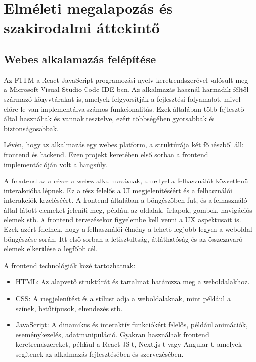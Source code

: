 \chapter{Elméleti megalapozás és szakirodalmi áttekintő}

\section {Webes alkalamazás felépítése}

Az F1TM a React JavaScript programozási nyelv keretrendszerével valósult meg a Microsoft Visual Studio Code IDE-ben. Az alkalmazás használ harmadik féltől származó könyvtárakat is, amelyek felgyorsítják a fejlesztési folyamatot, mivel előre le van implementálva számos funkcionalitás. Ezek általában több fejlesztő által használtak és vannak tesztelve, ezért többségében gyorsabbak és biztonságosabbak.

Lévén, hogy az alkalmazás egy webes platform, a struktúrája két fő részből áll: frontend és backend. Ezen projekt keretében első sorban a frontend implementációján volt a hangsúly.

A frontend az a része a webes alkalmazásnak, amellyel a felhasználók közvetlenül interakcióba lépnek. Ez a rész felelős a UI megjelenítéséért és a felhasználói interakciók kezeléséért. A frontend általában a böngészőben fut, és a felhasználó által látott elemeket jeleníti meg, például az oldalak, űrlapok, gombok, navigációs elemek stb. A frontend tervezésekor figyelembe kell venni a UX aspektusait is. Ezek azért felelnek, hogy a felhasználói élmény a lehető legjobb legyen a weboldal böngészése során. Itt első sorban a letisztultság, átláthatóság és az összezavaró elemek elkerülése a legfőbb cél.

A frontend technológiák közé tartozhatnak:
\begin{itemize}
	\item HTML: Az alapvető struktúrát és tartalmat határozza meg a weboldalakhoz.
	\item CSS: A megjelenítést és a stílust adja a weboldalaknak, mint például a színek, betűtípusok, elrendezés stb.
	\item JavaScript: A dinamikus és interaktív funkciókért felelős, például animációk, eseménykezelés, adatmanipuláció. Gyakran használnak frontend keretrendszereket, például a React JS-t, Next.js-t vagy Angular-t, amelyek segítenek az alkalmazás fejlesztésében és szervezésében. 
\end{itemize}

